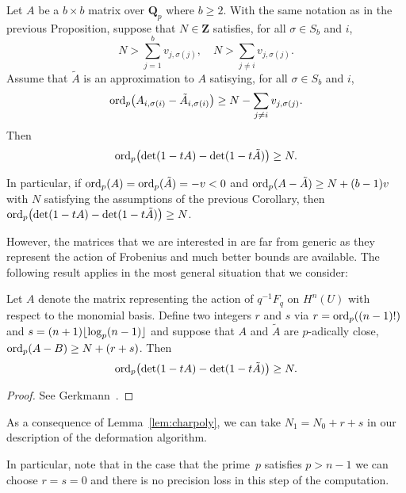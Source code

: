 \begin{cor}
Let $A$ be a $b \times b$ matrix over $\mathbf{Q}_p$ 
where $b \geq 2$.  With the same notation as in the 
previous Proposition, suppose that $N \in \mathbf{Z}$ 
satisfies, for all $\sigma \in S_b$ and $i$, 
\begin{equation*}
N > \sum_{j=1}^{b} v_{j,\sigma(j)}, \quad N > \sum_{j \neq i} v_{j,\sigma(j)}.
\end{equation*}
Assume that $\tilde{A}$ is an approximation to $A$
satisying, for all $\sigma \in S_b$ and $i$, 
\begin{equation*}
\operatorname{ord}_p \bigl(A_{i,\sigma(i)} - \tilde{A}_{i,\sigma(i)}\bigr) \geq N - \sum_{j \neq i} v_{j,\sigma(j)}.
\end{equation*}
Then 
\begin{equation*}
\operatorname{ord}_p\bigl( \det(1 - t A) - \det(1 - t \tilde{A}) \bigr) \geq N.
\end{equation*}
\end{cor}

\begin{rem}
In particular, if $\operatorname{ord}_p(A) = \operatorname{ord}_p(\tilde{A}) = -v < 0$ and 
$\operatorname{ord}_p(A - \tilde{A}) \geq N + (b - 1) v$ with $N$ satisfying 
the assumptions of the previous Corollary, then 
$\operatorname{ord}_p\bigl(\det(1 - t A) - \det(1 - t \tilde{A})\bigr) \geq N$.
\end{rem}

However, the matrices that we are interested in are far from generic 
as they represent the action of Frobenius and much better bounds are 
available.  The following result applies in the most general situation 
that we consider:

\begin{lem} \label{lem:charpoly}
Let $A$ denote the matrix representing the action of $q^{-1} F_q$ 
on $H^n(U)$ with respect to the monomial basis.  Define two 
integers $r$ and $s$ via \mbox{$r = \operatorname{ord}_p((n-1)!)$} and 
\mbox{$s = (n + 1) \lfloor\log_p (n-1)\rfloor$} and suppose that 
$A$ and $\tilde{A}$ are $p$-adically close, $\operatorname{ord}_p(A-B) \geq N + (r + s)$.  
Then 
\begin{equation*}
\operatorname{ord}_p \bigl( \det(1 - t A) - \det(1 - t \tilde{A}) \bigr) \geq N.
\end{equation*}
\end{lem}

\begin{proof} 
See Gerkmann~\citep[Lemma~3.3, Lemma~3.4]{Gerkmann2007}.
\end{proof}

\begin{rem}
As a consequence of Lemma~\ref{lem:charpoly}, we can take 
$N_1 = N_0 + r + s$ in our description of the deformation 
algorithm.

In particular, note that in the case that the prime~$p$ 
satisfies $p > n - 1$ we can choose $r = s = 0$ and there 
is no precision loss in this step of the computation.
\end{rem}

